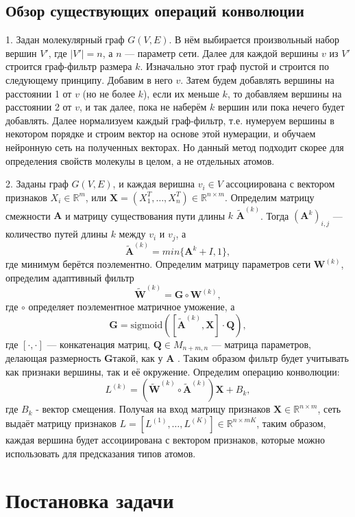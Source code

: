 \documentclass[12pt,twoside]{article}
\begin{document}
\subsection{Обзор существующих операций конволюции}
1. Задан молекулярный граф $G(V, E)$. В нём выбирается произвольный набор вершин $V'$, где $|V'|=n$, а $n$ --- параметр сети. Далее для каждой вершины $v$ из $V'$ строится граф-фильтр размера $k$. Изначально этот граф пустой и строится по следующему принципу. Добавим в него $v$. Затем будем добавлять вершины на расстоянии 1 от $v$ (но не более $k$), если их меньше $k$, то добавляем вершины на расстоянии 2 от $v$, и так далее, пока не наберём $k$ вершин или пока нечего будет добавлять. Далее нормализуем каждый граф-фильтр, т.е. нумеруем вершины в некотором порядке и строим вектор на основе этой нумерации, и обучаем нейронную сеть на полученных векторах.\cite{article15} Но данный метод подходит скорее для определения свойств молекулы в целом, а не отдельных атомов.

2. Заданы граф $G(V, E)$, и каждая веришна $v_i \in V$ ассоциирована с вектором признаков $X_i \in \mathbb{R}^m$, или $\mathbf{X}=(X_1^T,\dots,X_n^T) \in \mathbb{R}^{n \times m}$. Определим матрицу смежности $\mathbf{A}$ и матрицу существования пути длины $k$ $\widetilde{\mathbf{A}}^{(k)}$. Тогда $(\mathbf{A}^k)_{i,j}$ ---  количество путей длины $k$ между $v_i$ и $v_j$, а $$\widetilde{\mathbf{A}}^{(k)}=min\{\mathbf{A}^k + I, 1\},$$ где минимум берётся поэлементно. Определим матрицу параметров сети $\mathbf{W}^{(k)}$, определим адаптивный фильтр $$\mathbf{\widetilde{W}}^{(k)}=\mathbf{G} \circ \mathbf{W}^{(k)},$$ где $\circ$ определяет поэлементное матричное уможение, а $$\mathbf{G} = \text{sigmoid}([\widetilde{\mathbf{A}}^{(k)}, \mathbf{X}] \cdot \mathbf{Q}),$$ где $[\cdot, \cdot]$ --- конкатенация матриц, $\mathbf{Q} \in M_{n+m, n}$ --- матрица параметров, делающая размерность $\mathbf{G}$такой, как у $\mathbf{A}$ . Таким образом фильтр будет учитывать как признаки вершины, так и её окружение. Определим операцию конволюции: $$L^{(k)} = (\widetilde{\mathbf{W}}^{(k)} \circ \widetilde{\mathbf{A}}^{(k)}) \mathbf{X} + B_k,$$ где $B_k$ - вектор смещения. Получая на вход матрицу признаков $\mathbf{X}\in \mathbb{R}^{n \times m}$, сеть выдаёт матрицу признаков $L = [L^{(1)},\dots,L^{(K)}] \in \mathbb{R}^{n \times mK}$, таким образом, каждая вершина будет ассоциирована с вектором признаков, которые можно использовать для предсказания типов атомов.\cite{article20}

\section{Постановка задачи}
\end{document}
